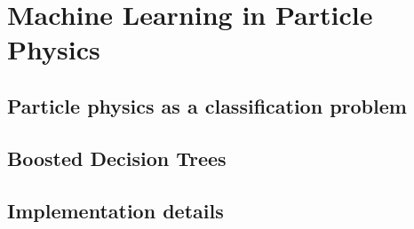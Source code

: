 \chapter{Machine Learning in Particle Physics}
\section{Particle physics as a classification problem}
\section{Boosted Decision Trees}
\section{Implementation details}
